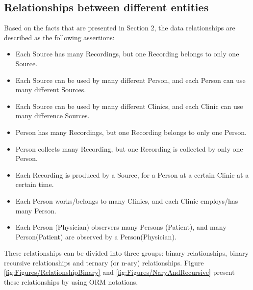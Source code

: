 \subsection{Relationships between different entities}
Based on the facts that are presented in Section 2, the data relationships are described as the following assertions:
\begin{itemize}
\item Each Source has many Recordings, but one Recording belongs to only one Source.\\
\item Each Source can be used by many different Person, and each Person can use many different Sources.\\
\item Each Source can be used by many different Clinics, and each Clinic can use many difference Sources.\\
\item Person has many Recordings, but one Recording belongs to only one Person.\\
\item Person collects many Recording, but one Recording is collected by only one Person.\\
\item Each Recording is produced by a Source, for a Person at a certain Clinic at a certain time.\\
\item Each Person works/belongs to many Clinics, and each Clinic employs/has many Person.\\
\item Each Person (Physician) observers many Persons (Patient), and many Person(Patient) are observed by a Person(Physician).
\end{itemize}
These relationships can be divided into three groups: binary relationships, binary recursive relationships and ternary (or n-ary) relationships. Figure \ref{fig:Figures/RelationshipBinary} and \ref{fig:Figures/NaryAndRecursive} present these relationships by using ORM notations.\\
